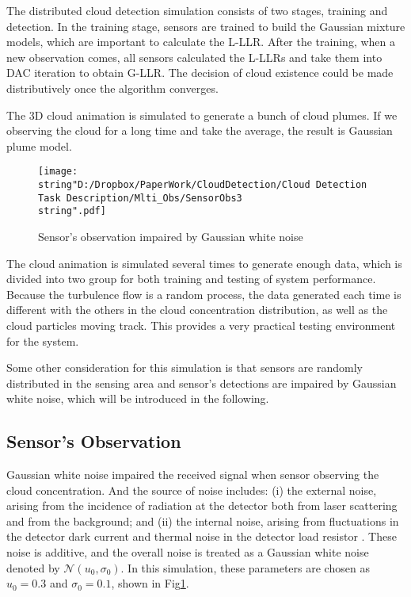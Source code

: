 The distributed cloud detection simulation consists of two stages,
training and detection. In the training stage, sensors are trained
to build the Gaussian mixture models, which are important to calculate
the L-LLR. After the training, when a new observation comes, all sensors
calculated the L-LLRs and take them into DAC iteration to obtain G-LLR.
The decision of cloud existence could be made distributively once
the algorithm converges. 

The 3D cloud animation is simulated to generate a bunch of cloud plumes.
If we observing the cloud for a long time and take the average, the
result is Gaussian plume model. 

\begin{figure}
\hfill{}\texttt{[image: \\string"D:/Dropbox/PaperWork/CloudDetection/Cloud Detection Task Description/Mlti\_Obs/SensorObs3\\string".pdf]}\hfill{}\hfill{}\caption{\label{fig:Sensor's obs}Sensor's observation impaired by Gaussian
white noise}
\end{figure}


The cloud animation is simulated several times to generate enough
data, which is divided into two group for both training and testing
of system performance. Because the turbulence flow is a random process,
the data generated each time is different with the others in the cloud
concentration distribution, as well as the cloud particles moving
track. This provides a very practical testing environment for the
system. 

Some other consideration for this simulation is that sensors are randomly
distributed in the sensing area and sensor's detections are impaired
by Gaussian white noise, which will be introduced in the following. 


\subsection{Sensor's Observation }

Gaussian white noise impaired the received signal when sensor observing
the cloud concentration. And the source of noise includes: (i) the
external noise, arising from the incidence of radiation at the detector
both from laser scattering and from the background; and (ii) the internal
noise, arising from fluctuations in the detector dark current and
thermal noise in the detector load resistor \cite{P.M.Hamilton1969}.
These noise is additive, and the overall noise is treated as a Gaussian
white noise denoted by $\mathcal{N}\left(u_{0},\sigma_{0}\right)$.
In this simulation, these parameters are chosen as $u_{0}=0.3$ and
$\sigma_{0}=0.1$, shown in Fig\ref{fig:Sensor's obs}.

